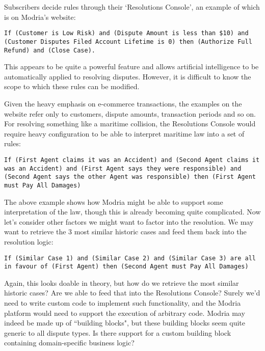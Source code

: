 Subscribers decide rules through their `Resolutions Console', an example of which is on Modria's website:

\begin{lstlisting}
If (Customer is Low Risk) and (Dispute Amount is less than $10) and (Customer Disputes Filed Account Lifetime is 0) then (Authorize Full Refund) and (Close Case).
\end{lstlisting}

This appears to be quite a powerful feature and allows artificial intelligence to be automatically applied to resolving disputes. However, it is difficult to know the scope to which these rules can be modified.

Given the heavy emphasis on e-commerce transactions, the examples on the website refer only to customers, dispute amounts, transaction periods and so on. For resolving something like a maritime collision, the Resolutions Console would require heavy configuration to be able to interpret maritime law into a set of rules:

\begin{lstlisting}
If (First Agent claims it was an Accident) and (Second Agent claims it was an Accident) and (First Agent says they were responsible) and (Second Agent says the other Agent was responsible) then (First Agent must Pay All Damages)
\end{lstlisting}

The above example shows how Modria might be able to support some interpretation of the law, though this is already becoming quite complicated. Now let's consider other factors we might want to factor into the resolution. We may want to retrieve the 3 most similar historic cases and feed them back into the resolution logic:

\begin{lstlisting}
If (Similar Case 1) and (Similar Case 2) and (Similar Case 3) are all in favour of (First Agent) then (Second Agent must Pay All Damages)
\end{lstlisting}

Again, this looks doable in theory, but how do we retrieve the most similar historic cases? Are we able to feed that into the Resolutions Console? Surely we'd need to write custom code to implement such functionality, and the Modria platform would need to support the execution of arbitrary code. Modria may indeed be made up of ``building blocks", but these building blocks seem quite generic to all dispute types. Is there support for a custom building block containing domain-specific business logic?

